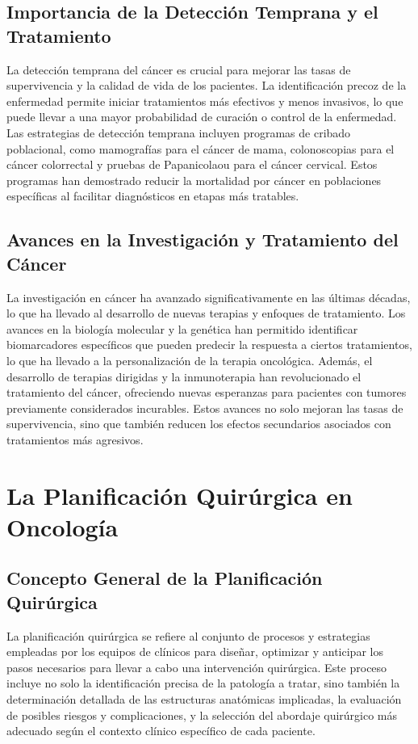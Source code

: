 \subsection{Importancia de la Detección Temprana y el Tratamiento}
\label{sec:importance-early-detection}
La detección temprana del cáncer es crucial para mejorar las tasas de supervivencia y la calidad de vida de los pacientes. La identificación precoz de la enfermedad permite iniciar tratamientos más efectivos y menos invasivos, lo que puede llevar a una mayor probabilidad de curación o control de la enfermedad. Las estrategias de detección temprana incluyen programas de cribado poblacional, como mamografías para el cáncer de mama, colonoscopias para el cáncer colorrectal y pruebas de Papanicolaou para el cáncer cervical. Estos programas han demostrado reducir la mortalidad por cáncer en poblaciones específicas al facilitar diagnósticos en etapas más tratables\cite{usptf2023cancer}.
\subsection{Avances en la Investigación y Tratamiento del Cáncer}
\label{sec:advances-cancer-research}          
La investigación en cáncer ha avanzado significativamente en las últimas décadas, lo que ha llevado al desarrollo de nuevas terapias y enfoques de tratamiento. Los avances en la biología molecular y la genética han permitido identificar biomarcadores específicos que pueden predecir la respuesta a ciertos tratamientos, lo que ha llevado a la personalización de la terapia oncológica\cite{Hanahan2022}. Además, el desarrollo de terapias dirigidas y la inmunoterapia han revolucionado el tratamiento del cáncer\cite{Schreiber2021}, ofreciendo nuevas esperanzas para pacientes con tumores previamente considerados incurables. Estos avances no solo mejoran las tasas de supervivencia, sino que también reducen los efectos secundarios asociados con tratamientos más agresivos\cite{Mukherjee2010}.

\section{La Planificación Quirúrgica en Oncología}
\label{sec:oncology-surgical-planning}

\subsection{Concepto General de la Planificación Quirúrgica}
\label{sec:general-concept-surgical-planning}
La planificación quirúrgica se refiere al conjunto de procesos y estrategias empleadas por los equipos de clínicos para diseñar, optimizar y anticipar los pasos necesarios para llevar a cabo una intervención quirúrgica. Este proceso incluye no solo la identificación precisa de la patología a tratar, sino también la determinación detallada de las estructuras anatómicas implicadas, la evaluación de posibles riesgos y complicaciones, y la selección del abordaje quirúrgico más adecuado según el contexto clínico específico de cada paciente\cite{Gillies2020}. 

